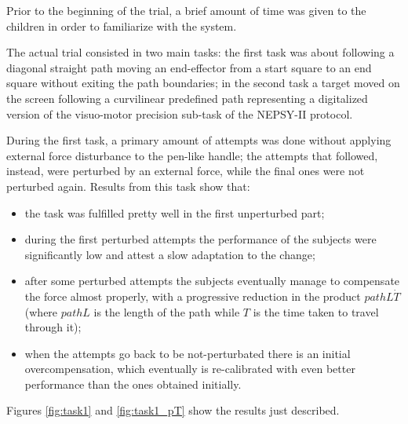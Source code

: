 \documentclass[12pt,journal,draftclsnofoot,onecolumn]{IEEEtran}
\begin{document}
Prior to the beginning of the trial, a brief amount of time was given to the children in order to familiarize with the system.

The actual trial consisted in two main tasks: the first task was about following a diagonal straight path moving an end-effector from a start square to an end square without exiting the path boundaries; in the second task a target moved on the screen following a curvilinear predefined path representing a digitalized version of the visuo-motor precision sub-task of the NEPSY-II protocol.

During the first task, a primary amount of attempts was done without applying external force disturbance to the pen-like handle; the attempts that followed, instead, were perturbed by an external force, while the final ones were not perturbed again. Results from this task show that:
\begin{itemize}
\item the task was fulfilled pretty well in the first unperturbed part;
\item during the first perturbed attempts the performance of the subjects were significantly low and attest a slow adaptation to the change;
\item after some perturbed attempts the subjects eventually manage to compensate the force almost properly, with a progressive reduction in the product $pathL \dot T$ (where $pathL$ is the length of the path while $T$ is the time taken to travel through it);
\item when the attempts go back to be not-perturbated there is an initial overcompensation, which eventually is re-calibrated with even better performance than the ones obtained initially.
\end{itemize}

Figures \ref{fig:task1} and \ref{fig:task1_pT} show the results just described.
\end{document}
